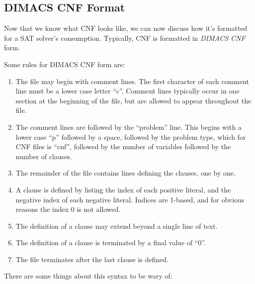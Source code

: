 \documentclass[oneside]{book}
\begin{document}
\subsection*{DIMACS CNF Format}

Now that we know what CNF looks like, we can now discuss how it's formatted
for a SAT solver's consumption. Typically, CNF is formatted in
\emph{DIMACS CNF} form.

Some rules for DIMACS CNF form are:

\begin{enumerate}
    \item The file may begin with comment lines. The first character of each
    comment line must be a lower case letter ``c''. Comment lines typically
    occur in one section at the beginning of the file, but are allowed to appear
    throughout the file.

    \item The comment lines are followed by the ``problem'' line. This begins
    with a lower case ``p'' followed by a space, followed by the problem type,
    which for CNF files is ``cnf'', followed by the number of variables followed
    by the number of clauses.

    \item The remainder of the file contains lines defining the clauses, one by
    one.

    \item A clause is defined by listing the index of each positive literal, and
    the negative index of each negative literal. Indices are 1-based, and for
    obvious reasons the index 0 is not allowed.

    \item The definition of a clause may extend beyond a single line of text.

    \item The definition of a clause is terminated by a final value of
    ``0''.

    \item The file terminates after the last clause is defined.
\end{enumerate}

There are some things about this syntax to be wary of:
\end{document}

